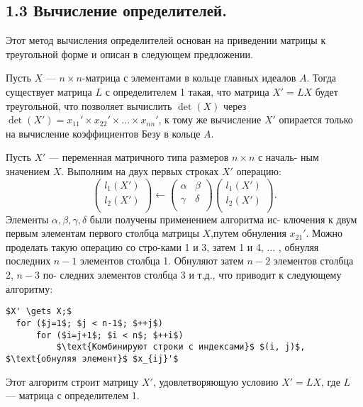 \subsection{1.3 Вычисление определителей.}
Этот метод вычисления определителей основан на приведении матрицы \linebreak к треугольной форме и описан в следующем предложении.  
\begin{predl} 
Пусть $X$ --- $n \times n$-матрица с элементами в кольце главных идеалов \linebreak $A$. Тогда существует матрица $L$ с определителем 1 такая, что матрица \linebreak $X' = LX$ будет треугольной, что позволяет вычислить $\det(X)$ через \linebreak $\det(X') = {x_{11}}' \times {x_{22}}' \times ... \times {x_{nn}}' $, к тому же вычисление $X'$ опирается  \linebreak только на вычисление коэффициентов Безу в кольце $A$.
\end{predl}
\begin{myproof}
Пусть $X'$ --- переменная матричного типа размеров $n \times n$ с началь- \linebreak ным значением $X$. Выполним на двух первых строках $X'$ операцию:  
$${\left( \begin{array}{ccc}
l_1(X') \\
l_2(X') \\
\end{array} \right)}\gets {\left( \begin{array}{ccc}
\alpha & \beta \\
\gamma & \delta \\
\end{array} \right)}{\left( \begin{array}{ccc}
l_1(X') \\
l_2(X') \\
\end{array} \right)}.$$
\newpage
\noindent Элементы $\alpha, \beta, \gamma, \delta$ были получены применением алгоритма ис- \linebreak ключения к двум первым элементам первого столбца матрицы $X$,\linebreak путем обнуления ${x_{21}}'$. Можно проделать такую операцию со стро-\linebreak ками 1 и 3, затем 1 и 4, ... , обнуляя последних $n - 1$ элементов \linebreak столбца 1. Обнуляют затем $n - 2$ элементов столбца 2, $n - 3$ по- \linebreak следних элементов столбца 3 и т.д., что приводит к следующему \linebreak алгоритму:  
\begin{lstlisting}[mathescape=true]
  $X' \gets X;$
  for ($j=1$; $j < n-1$; $++j$) 
      for ($i=j+1$; $i < n$; $++i$)  
          $\text{Комбинируют строки с индексами}$ $(i, j)$, $\text{обнуляя элемент}$ $x_{ij}'$
\end{lstlisting}
Этот алгоритм строит матрицу $X'$, удовлетворяющую условию $X' = LX$, где $L$ --- матрица с определителем 1.
\end{myproof}
